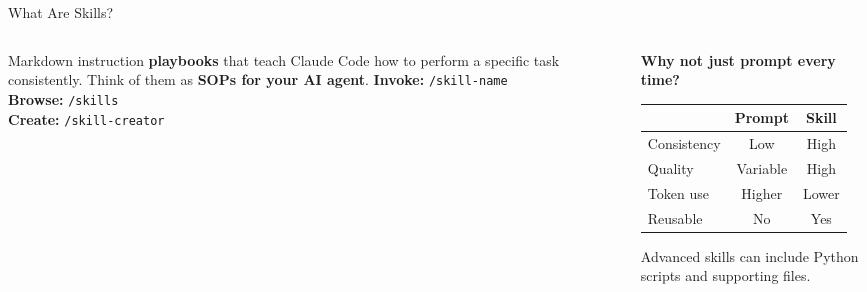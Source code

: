 \documentclass[aspectratio=169, 10pt]{beamer}
\begin{document}
\begin{frame}{What Are Skills?}
\begin{columns}[T]
\begin{column}{0.46\textwidth}
\begin{tcolorbox}[keybox, title={\faCubes\quad Definition}]
\scriptsize
Markdown instruction \textbf{playbooks} that teach Claude Code how to perform a specific task consistently.
\vskip3pt
Think of them as \textbf{SOPs for your AI agent}.
\vskip3pt
\textbf{Invoke:} \texttt{/skill-name}\\
\textbf{Browse:} \texttt{/skills}\\
\textbf{Create:} \texttt{/skill-creator}
\end{tcolorbox}
\end{column}
\begin{column}{0.46\textwidth}
\begin{tcolorbox}[colback=PaleSage, colframe=SlateTeal!50, boxrule=0.4pt, left=5pt, right=5pt, top=3pt, bottom=3pt]
\scriptsize
\textbf{Why not just prompt every time?}
\vskip3pt
\begin{tabular}{@{}l@{\;}c@{\;}c@{}}
 & \textbf{Prompt} & \textbf{Skill} \\
\midrule
Consistency & \textcolor{SoftCoral}{Low} & \textcolor{SlateTeal}{High} \\
Quality & \textcolor{CoolGray}{Variable} & \textcolor{SlateTeal}{High} \\
Token use & \textcolor{SoftCoral}{Higher} & \textcolor{SlateTeal}{Lower} \\
Reusable & \textcolor{SoftCoral}{No} & \textcolor{SlateTeal}{Yes} \\
\end{tabular}
\end{tcolorbox}
\vskip3pt
{\tiny\color{CoolGray} Advanced skills can include Python scripts and supporting files.}
\end{column}
\end{columns}
\end{frame}
\end{document}

